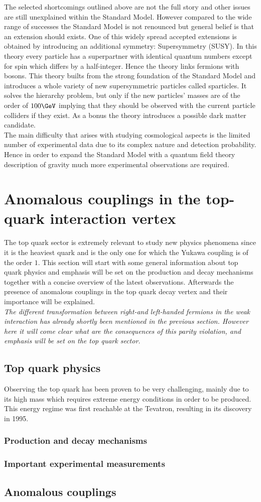 The selected shortcomings outlined above are not the full story and other issues are still unexplained within the Standard Model. However compared to the wide range of successes the Standard Model is not renounced but general belief is that an extension should exists. One of this widely spread accepted extensions is obtained by introducing an additional symmetry: Supersymmetry (SUSY). In this theory every particle has a superpartner with identical quantum numbers except for spin which differs by a half-integer. Hence the theory links fermions with bosons. This theory builts from the strong foundation of the Standard Model and introduces a whole variety of new supersymmetric particles called sparticles. It solves the hierarchy problem, but only if the new particles' masses are of the order of $100 \GeV$ implying that they should be observed with the current particle colliders if they exist. As a bonus the theory introduces a possible dark matter candidate.
\\
The main difficulty that arises with studying cosmological aspects is the limited number of experimental data due to its complex nature and detection probability. Hence in order to expand the Standard Model with a quantum field theory description of gravity much more experimental observations are required.

\section{Anomalous couplings in the top-quark interaction vertex}
The top quark sector is extremely relevant to study new physics phenomena since it is the heaviest quark and is the only one for which the Yukawa coupling is of the order $1$. This section will start with some general information about top quark physics and emphasis will be set on the production and decay mechanisms together with a concise overview of the latest observations. Afterwards the presence of anomalous couplings in the top quark decay vertex and their importance will be explained.
\\

\textit{The different transformation between right-and left-handed fermions in the weak interaction has already shortly been mentioned in the previous section. However here it will come clear what are the consequences of this parity violation, and emphasis will be set on the top quark sector.}

\subsection{Top quark physics}
Observing the top quark has been proven to be very challenging, mainly due to its high mass which requires extreme energy conditions in order to be produced. This energy regime was first reachable at the Tevatron, resulting in its discovery in 1995.

\subsubsection{Production and decay mechanisms}

\subsubsection{Important experimental measurements}

\subsection{Anomalous couplings}